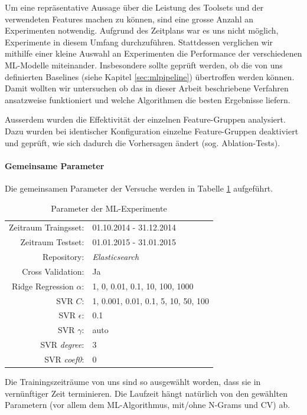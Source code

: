 \documentclass[10pt, a4paper]{article}
\begin{document}
Um eine repräsentative Aussage über die Leistung des Toolsets und der verwendeten Features machen zu können, sind eine grosse Anzahl an Experimenten notwendig. Aufgrund des Zeitplans war es uns nicht möglich, Experimente in diesem Umfang durchzuführen. Stattdessen verglichen wir mithilfe einer kleine Auswahl an Experimenten die Performance der verschiedenen \ac{ML}-Modelle miteinander. Insbesondere sollte geprüft werden, ob die von uns definierten Baselines (siehe Kapitel \ref{sec:mlpipeline}) übertroffen werden können. Damit wollten wir untersuchen ob das in dieser Arbeit beschriebene Verfahren ansatzweise funktioniert und welche Algorithmen die besten Ergebnisse liefern.

Ausserdem wurden die Effektivität der einzelnen Feature-Gruppen analysiert. Dazu wurden bei identischer Konfiguration einzelne Feature-Gruppen deaktiviert und geprüft, wie sich dadurch die Vorhersagen ändert (sog. Ablation-Tests).

\paragraph{Gemeinsame Parameter} Die gemeinsamen Parameter der Versuche werden in Tabelle \ref{tab:ml_experiments_parameter} aufgeführt.

\begin{table}[h]
	\begin{tabular}{rl}
	\hline
	Zeitraum Traingsset:		& 01.10.2014 - 31.12.2014	\\
	Zeitraum Testset:		& 01.01.2015 - 31.01.2015 	\\
	Repository:					& \emph{Elasticsearch}	\\
	Cross Validation:			& Ja	\\
	Ridge Regression \(\alpha\):& 1, 0, 0.01, 0.1, 10, 100, 1000	\\
	\acs{SVR} \(C\):			& 1, 0.001, 0.01,  0.1, 5, 10, 50, 100	\\
	\acs{SVR} \(\epsilon\):		& 0.1	\\
	\acs{SVR} \(\gamma\):		& auto	\\
	\acs{SVR} \emph{degree}:	& 3	\\
	\acs{SVR} \emph{coef0}:		& 0	\\
	\hline
	\end{tabular}
	\centering
	\caption{Parameter der ML-Experimente}
	\label{tab:ml_experiments_parameter}
\end{table}

Die Trainingszeiträume von uns sind so ausgewählt worden, dass sie in vernünftiger Zeit terminieren. Die Laufzeit hängt natürlich von den gewählten Parametern (vor allem dem ML-Algorithmus, mit/ohne N-Grams und \ac{CV}) ab.
\end{document}
